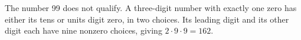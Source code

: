 The number 99 does not qualify. A three-digit number with exactly one zero has either its tens or units digit zero, in two choices. Its leading digit and its other digit each have nine nonzero choices, giving $2\cdot9\cdot9=\boxed{162}$.
